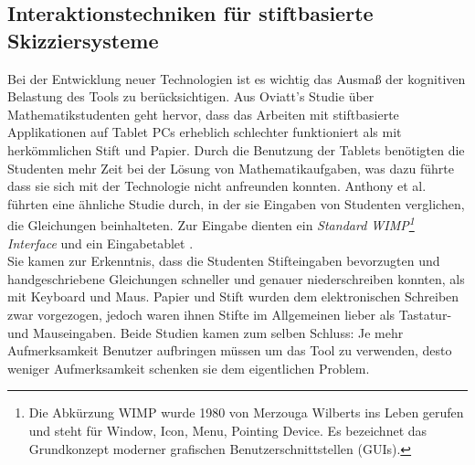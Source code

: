 \subsection{Interaktionstechniken für stiftbasierte Skizziersysteme} %
Bei der Entwicklung neuer Technologien ist es wichtig das Ausmaß der kognitiven Belastung des Tools zu berücksichtigen. Aus Oviatt's Studie \citep{Oviatt:2006} über Mathematikstudenten geht hervor, dass das Arbeiten mit stiftbasierte Applikationen auf Tablet PCs erheblich schlechter funktioniert als mit herkömmlichen Stift und Papier. Durch die Benutzung der Tablets benötigten die Studenten mehr Zeit bei der Lösung von Mathematikaufgaben, was dazu führte dass sie sich mit der Technologie nicht anfreunden konnten. Anthony et al. führten eine ähnliche Studie durch, in der sie Eingaben von Studenten verglichen, die Gleichungen beinhalteten. Zur Eingabe dienten ein \emph{Standard WIMP\footnote{Die Abkürzung WIMP wurde 1980 von Merzouga Wilberts ins Leben gerufen und steht für Window, Icon, Menu, Pointing Device. Es bezeichnet das Grundkonzept moderner grafischen Benutzerschnittstellen (GUIs).} Interface} und ein Eingabetablet \citep{Anthony:2005}. \\ Sie kamen zur Erkenntnis, dass die Studenten Stifteingaben bevorzugten und handgeschriebene Gleichungen schneller und genauer niederschreiben konnten, als mit Keyboard und Maus. Papier und Stift wurden dem elektronischen Schreiben zwar vorgezogen, jedoch waren ihnen Stifte im Allgemeinen lieber als Tastatur- und Mauseingaben. Beide Studien kamen zum selben Schluss: Je mehr Aufmerksamkeit Benutzer aufbringen müssen um das Tool zu verwenden, desto weniger Aufmerksamkeit schenken sie dem eigentlichen Problem.

